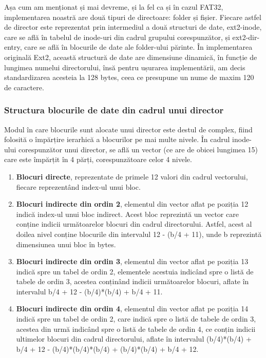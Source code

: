 Așa cum am menționat și mai devreme, și la fel ca și în cazul FAT32, implementarea noastră are două tipuri de directoare: folder și fișier. Fiecare astfel de director este reprezentat prin intermediul a două structuri de date, ext2-inode, care se află în tabelul de inode-uri din cadrul grupului corespunzător, și ext2-dir-entry, care se află în blocurile de date ale folder-ului părinte. În implementarea originală Ext2, această structură de date are dimensiune dinamică, în funcție de lungimea numelui directorului, însă pentru ușurarea implementării, am decis standardizarea acesteia la 128 bytes, ceea ce presupune un nume de maxim 120 de caractere.

\subsubsection{Structura blocurile de date din cadrul unui director}

Modul în care blocurile sunt alocate unui director este destul de complex, fiind folosită o împărțire ierarhică a blocurilor pe mai multe nivele. În cadrul inode-ului corespunzător unui director, se află un vector (ce are de obicei lungimea 15) care este împărțit în 4 părți, corespunzătoare celor 4 nivele.

\begin{enumerate}
  \item \textbf{Blocuri directe}, reprezentate de primele 12 valori din cadrul vectorului, fiecare reprezentând index-ul unui bloc.

  \item \textbf{Blocuri indirecte din ordin 2}, elementul din vector aflat pe poziția 12 indică index-ul unui bloc indirect. Acest bloc reprezintă un vector care conține indicii următoarelor blocuri din cadrul directorului. Astfel, acest al doilea nivel conține blocurile din intervalul 12 - (b/4 + 11), unde b reprezintă dimensiunea unui bloc în bytes.

  \item \textbf{Blocuri indirecte din ordin 3}, elementul din vector aflat pe poziția 13 indică spre un tabel de ordin 2, elementele acestuia indicând spre o listă de tabele de ordin 3, acestea conținând indicii următoarelor blocuri, aflate în intervalul b/4 + 12 -  (b/4)*(b/4) + b/4 + 11.

  \item \textbf{Blocuri indirecte din ordin 4}, elementul din vector aflat pe poziția 14 indică spre un tabel de ordin 2, care indică spre o listă de tabele de ordin 3, acestea din urmă indicând spre o listă de tabele de ordin 4, ce conțin indicii ultimelor blocuri din cadrul directorului, aflate în intervalul (b/4)*(b/4) + b/4 + 12 - (b/4)*(b/4)*(b/4) + (b/4)*(b/4) + b/4 + 12.

\end{enumerate}

